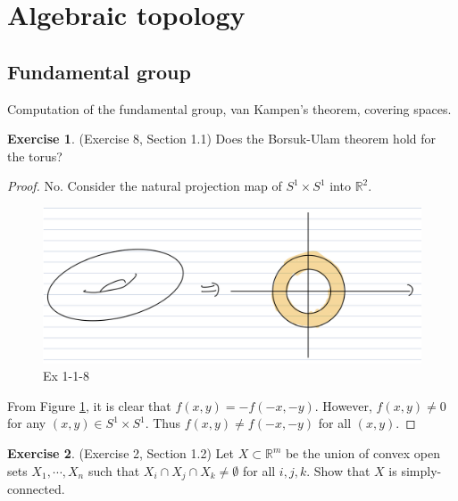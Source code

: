 \documentclass[12pt, psamsfonts]{amsart}
\theoremstyle{definition}
\newtheorem*{exer}{Exercise}
\theoremstyle{remark}
\numberwithin{equation}{section}
\begin{document}
\section{Algebraic topology}

\subsection{Fundamental group}
Computation of the fundamental group, van Kampen's theorem, covering spaces.

\begin{exer}{(Exercise 8, Section 1.1)}
  Does the Borsuk-Ulam theorem hold for the torus?
\end{exer}

\begin{proof}
  No.
  Consider the natural projection map of $S^1 \times S^1$ into $\mathbb{R}^2$.
  \begin{figure}[!htb]
    \includegraphics[width=.5\linewidth]{img/hatcher/ex-1-1-8.jpeg}
      \caption{Ex 1-1-8}
    \label{fig:ex_1_1_8}
  \end{figure}
  From Figure \ref{fig:ex_1_1_8}, it is clear that $f(x, y) = -f(-x, -y)$.
  However, $f(x, y) \ne 0$ for any $(x, y) \in S^1 \times S^1$.
  Thus $f(x, y) \ne f(-x, -y)$ for all $(x, y)$.
\end{proof}

\begin{exer}{(Exercise 2, Section 1.2)}
  Let $X \subset \mathbb{R}^m$ be the union of convex open sets $X_1, \cdots, X_n$ such that $X_i \cap X_j \cap X_k \ne \emptyset$ for all $i, j, k$.
  Show that $X$ is simply-connected.
\end{exer}
\end{document}
